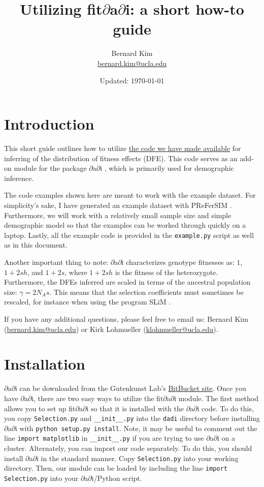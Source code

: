 \documentclass[11pt]{article}
\title{Utilizing fit$\partial$a$\partial$i: a short how-to guide}
\author{Bernard Kim\\ \href{mailto:bernard.kim@ucla.edu}{bernard.kim@ucla.edu}}
\date{Updated: \today}
\begin{document}
\maketitle

\section{Introduction}

This short guide outlines how to utilize \href{https://github.com/LohmuellerLab/fit$\partial$a$\partial$i}{the code we have made available} for inferring of the distribution of fitness effects (DFE). This code serves as an add-on module for the package $\partial$a$\partial$i \cite{gutenkunst2009}, which is primarily used for demographic inference.

The code examples shown here are meant to work with the example dataset. For simplicity's sake, I have generated an example dataset with PReFerSIM \cite{ortega2016}. Furthermore, we will work with a relatively small sample size and simple demographic model so that the examples can be worked through quickly on a laptop. Lastly, all the example code is provided in the \texttt{example.py} script as well as in this document.

Another important thing to note: $\partial$a$\partial$i characterizes genotype fitnesses as: $1$, $1+2sh$, and $1+2s$, where $1+2sh$ is the fitness of the heterozygote. Furthermore, the DFEs inferred are scaled in terms of the ancestral population size: $\gamma=2N_{A}s$. This means that the selection coefficients must sometimes be rescaled, for instance when using the program SLiM \cite{haller2016}.

If you have any additional questions, please feel free to email us: Bernard Kim \\(\href{mailto:bernard.kim@ucla.edu}{bernard.kim@ucla.edu}) or Kirk Lohmueller (\href{mailto:klohmueller@ucla.edu}{klohmueller@ucla.edu}).

\section{Installation}

$\partial$a$\partial$i can be downloaded from the Gutenkunst Lab's \href{https://bitbucket.org/gutenkunstlab/dadi/}{BitBucket site}. Once you have $\partial$a$\partial$i, there are two easy ways to utilize the fit$\partial$a$\partial$i module. The first method allows you to set up fit$\partial$a$\partial$i so that it is installed with the $\partial$a$\partial$i code. To do this, you copy \texttt{Selection.py} and \texttt{\_\_init\_\_.py} into the \texttt{dadi} directory before installing $\partial$a$\partial$i with \texttt{python setup.py install}. Note, it may be useful to comment out the line \texttt{import matplotlib} in \texttt{\_\_init\_\_.py} if you are trying to use $\partial$a$\partial$i on a cluster. Alternately, you can import our code separately. To do this, you should install $\partial$a$\partial$i in the standard manner. Copy \texttt{Selection.py} into your working directory. Then, our module can be loaded by including the line \texttt{import Selection.py} into your $\partial$a$\partial$i/Python script. 
\end{document}
